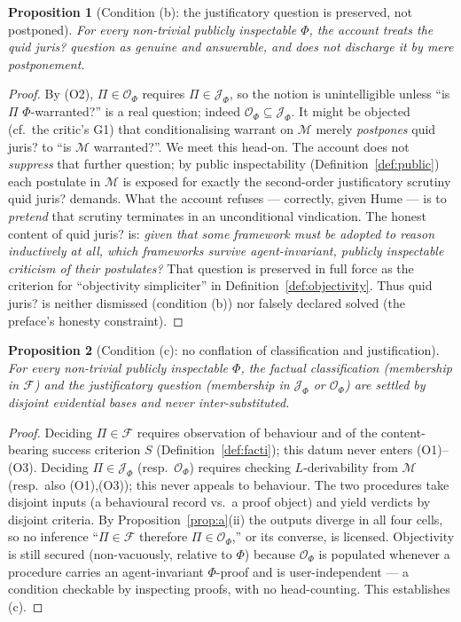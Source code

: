 \documentclass{amsart}
\theoremstyle{definition}
\theoremstyle{plain}
\newtheorem{proposition}{Proposition}
\theoremstyle{remark}
\begin{document}
\begin{proposition}[Condition (b): the justificatory question is preserved,
not postponed]\label{prop:b}
For every non-trivial publicly inspectable $\Phi$, the account treats the quid
juris? question as genuine and answerable, and does not discharge it by mere
postponement.
\end{proposition}

\begin{proof}
By (O2), $\Pi\in\mathcal{O}_\Phi$ requires $\Pi\in\mathcal{J}_\Phi$, so the
notion is unintelligible unless ``is $\Pi$ $\Phi$-warranted?'' is a real
question; indeed $\mathcal{O}_\Phi\subseteq\mathcal{J}_\Phi$. It might be
objected (cf.\ the critic's G1) that conditionalising warrant on $\mathcal{M}$
merely \emph{postpones} quid juris? to ``is $\mathcal{M}$ warranted?''. We meet
this head-on. The account does not \emph{suppress} that further question; by
public inspectability (Definition~\ref{def:public}) each postulate in
$\mathcal{M}$ is exposed for exactly the second-order justificatory scrutiny
quid juris? demands. What the account refuses --- correctly, given Hume --- is
to \emph{pretend} that scrutiny terminates in an unconditional vindication. The
honest content of quid juris? is: \emph{given that some framework must be
adopted to reason inductively at all, which frameworks survive agent-invariant,
publicly inspectable criticism of their postulates?} That question is preserved
in full force as the criterion for ``objectivity simpliciter'' in
Definition~\ref{def:objectivity}. Thus quid juris? is neither dismissed
(condition (b)) nor falsely declared solved (the preface's honesty
constraint).
\end{proof}

\begin{proposition}[Condition (c): no conflation of classification and
justification]\label{prop:c}
For every non-trivial publicly inspectable $\Phi$, the factual classification
(membership in $\mathcal{F}$) and the justificatory question (membership in
$\mathcal{J}_\Phi$ or $\mathcal{O}_\Phi$) are settled by disjoint evidential
bases and never inter-substituted.
\end{proposition}

\begin{proof}
Deciding $\Pi\in\mathcal{F}$ requires observation of behaviour and of the
content-bearing success criterion $S$ (Definition~\ref{def:facti}); this datum
never enters (O1)--(O3). Deciding $\Pi\in\mathcal{J}_\Phi$ (resp.\
$\mathcal{O}_\Phi$) requires checking $L$-derivability from $\mathcal{M}$
(resp.\ also (O1),(O3)); this never appeals to behaviour. The two procedures
take disjoint inputs (a behavioural record vs.\ a proof object) and yield
verdicts by disjoint criteria. By Proposition~\ref{prop:a}(ii) the outputs
diverge in all four cells, so no inference ``$\Pi\in\mathcal{F}$ therefore
$\Pi\in\mathcal{O}_\Phi$,'' or its converse, is licensed. Objectivity is still
secured (non-vacuously, relative to $\Phi$) because $\mathcal{O}_\Phi$ is
populated whenever a procedure carries an agent-invariant $\Phi$-proof and is
user-independent --- a condition checkable by inspecting proofs, with no
head-counting. This establishes (c).
\end{proof}
\end{document}
